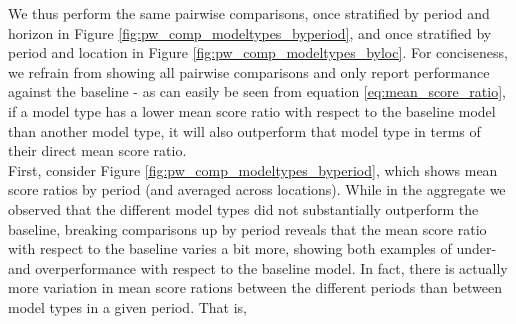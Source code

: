 We thus perform the same pairwise comparisons, once stratified by period and horizon in Figure \ref{fig:pw_comp_modeltypes_byperiod}, and once stratified by period and location in Figure \ref{fig:pw_comp_modeltypes_byloc}. For conciseness, we refrain from showing all pairwise comparisons and only report performance against the baseline - as can easily be seen from equation \ref{eq:mean_score_ratio}, if a model type has a lower mean score ratio with respect to the baseline model than another model type, it will also outperform that model type in terms of their direct mean score ratio.\\
First, consider Figure \ref{fig:pw_comp_modeltypes_byperiod}, which shows mean score ratios by period (and averaged across locations). While in the aggregate we observed that the different model types did not substantially outperform the baseline, breaking comparisons up by period reveals that the mean score ratio with respect to the baseline varies a bit more, showing both examples of under- and overperformance with respect to the baseline model. In fact, there is actually more variation in mean score rations between the different periods than between model types in a given period. That is, %
